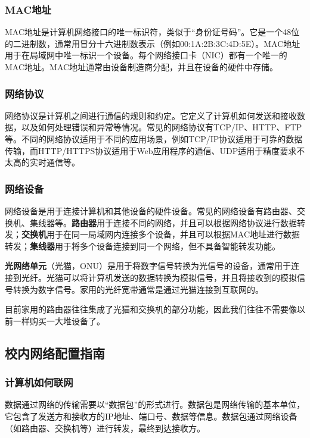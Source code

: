 \subsubsection{MAC地址}

MAC地址是计算机网络接口的唯一标识符，类似于“身份证号码”。它是一个48位的二进制数，通常用冒分十六进制数表示（例如00:1A:2B:3C:4D:5E）。MAC地址用于在局域网中唯一标识一个设备。每个网络接口卡（NIC）都有一个唯一的MAC地址。MAC地址通常由设备制造商分配，并且在设备的硬件中存储。

\subsubsection{网络协议}

网络协议是计算机之间进行通信的规则和约定。它定义了计算机如何发送和接收数据，以及如何处理错误和异常等情况。常见的网络协议有TCP/IP、HTTP、FTP等。不同的网络协议适用于不同的应用场景，例如TCP/IP协议适用于可靠的数据传输，而HTTP/HTTPS协议适用于Web应用程序的通信、UDP适用于精度要求不太高的实时通信等。

\subsubsection{网络设备}

网络设备是用于连接计算机和其他设备的硬件设备。常见的网络设备有路由器、交换机、集线器等。\textbf{路由器}用于连接不同的网络，并且可以根据网络协议进行数据转发；\textbf{交换机}用于在同一局域网内连接多个设备，并且可以根据MAC地址进行数据转发；\textbf{集线器}用于将多个设备连接到同一个网络，但不具备智能转发功能。

\textbf{光网络单元}（光猫，ONU）是用于将数字信号转换为光信号的设备，通常用于连接到光纤。光猫可以将计算机发送的数据转换为模拟信号，并且将接收到的模拟信号转换为数字信号。家用的光纤宽带通常是通过光猫连接到互联网的。

目前家用的路由器往往集成了光猫和交换机的部分功能，因此我们往往不需要像以前一样购买一大堆设备了。

\subsection{校内网络配置指南}

\subsubsection{计算机如何联网}

数据通过网络的传输需要以“数据包”的形式进行。数据包是网络传输的基本单位，它包含了发送方和接收方的IP地址、端口号、数据等信息。数据包通过网络设备（如路由器、交换机等）进行转发，最终到达接收方。

